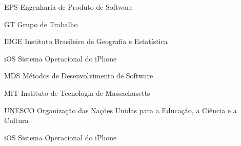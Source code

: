 \begin{siglas}
  \item[EPS] Engenharia de Produto de Software
  \item[GT] Grupo de Trabalho
  \item[IBGE] Instituto Brasileiro de Geografia e Estatística
  \item[iOS] Sistema Operacional do iPhone 
  \item[MDS] Métodos de Desenvolvimento de Software
  \item[MIT] Instituto de Tecnologia de Massachusetts
  \item[UNESCO] Organização das Nações Unidas para a Educação, a Ciência e a Cultura
  \item[iOS] Sistema Operacional do iPhone 
\end{siglas}
